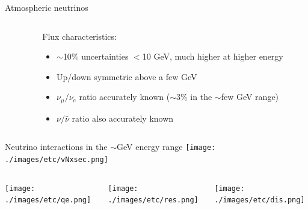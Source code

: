 \begin{frame}[t]{Atmospheric neutrinos}
\begin{columns}
\begin{column}{0.64\textwidth}
  \end{column}
  \begin{column}{0.35\textwidth}
   {\small
     Flux characteristics:
      \begin{itemize}
        \item $\sim$10\% uncertainties $<$10 GeV, much higher at higher energy
        \item Up/down symmetric above a few GeV
        \item $\nu_{\mu}/\nu_{e}$ ratio accurately known
              ($\sim$3\% in the $\sim$few GeV range)
         \item $\nu/\bar{\nu}$ ratio also accurately known
      \end{itemize}
   }
  \end{column}
\end{columns}
\end{frame}


\begin{frame}{Neutrino interactions in the $\sim$GeV energy range}
\centering
\texttt{[image: ./images/etc/vNxsec.png]}\\
\begin{columns}
  \begin{column}{0.33\textwidth}
    \texttt{[image: ./images/etc/qe.png]}
  \end{column}
  \begin{column}{0.33\textwidth}
    \texttt{[image: ./images/etc/res.png]}
  \end{column}
  \begin{column}{0.33\textwidth}
    \texttt{[image: ./images/etc/dis.png]}
  \end{column}
\end{columns}
\end{frame}



